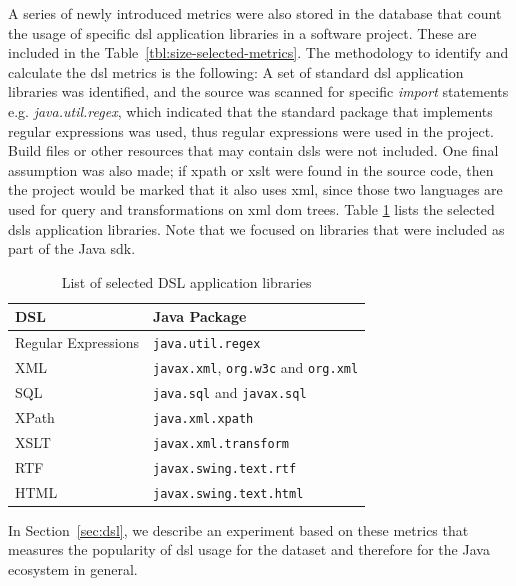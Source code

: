\documentclass{sig-alternate}
\begin{document}
A series of newly introduced metrics were also stored in the database that count the usage of specific {\sc dsl} application libraries in a software project. These are included in the Table~\ref{tbl:size-selected-metrics}. The methodology to identify and calculate the {\sc dsl} metrics is the following: A set of standard {\sc dsl} application libraries was identified, and the source was scanned for specific \textit{import} statements e.g. \textit{java.util.regex}, which indicated that the standard package that implements regular expressions was used, thus regular expressions were used in the project. Build files or other resources that may contain {\sc dsl}s were not included. One final assumption was also made; if {\sc xpath} or {\sc xslt} were found in the source code, then the project would be marked that it also uses {\sc xml}, since those two languages are used for query and transformations on {\sc xml} {\sc dom} trees. Table \ref{tbl:dsl-list} lists the selected {\sc dsl}s application libraries. Note that we focused on libraries that were  included as part of the Java {\sc sdk}.

\begin{table}
\centering
\caption{List of selected DSL application libraries}
\label{tbl:dsl-list}
\begin{tabular}{l l}
 \hline
\textbf{DSL} & \textbf{Java Package}\\
\hline
Regular Expressions & \verb|java.util.regex|\\
XML & \verb|javax.xml|, \verb|org.w3c| and \verb|org.xml|\\
SQL & \verb|java.sql| and \verb|javax.sql|\\
XPath & \verb|java.xml.xpath|\\
XSLT & \verb|javax.xml.transform|\\
RTF & \verb|javax.swing.text.rtf|\\
HTML & \verb|javax.swing.text.html|\\
\hline
\end{tabular}
\end{table}

In Section~\ref{sec:dsl}, we describe an experiment based on these metrics that measures the popularity of {\sc dsl} usage for the dataset and therefore for the Java ecosystem in general.
\end{document}
